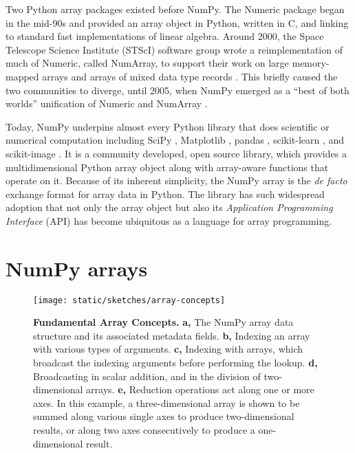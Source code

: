 Two Python array packages existed before NumPy.
The Numeric package began in the mid-90s and provided an array object in
Python, written in C, and linking to standard fast implementations of linear
algebra.
Around 2000, the Space Telescope Science Institute (STScI) software group wrote
a reimplementation of much of Numeric, called NumArray, to support their work
on large memory-mapped arrays and arrays of mixed data type
records \cite{STScI-slither}.
This briefly caused the two communities to diverge, until
2005, when NumPy emerged as a ``best of both worlds'' unification of Numeric
and NumArray \cite{oliphant2006guide}.

Today, NumPy underpins almost every Python library that does scientific or
numerical computation including SciPy \cite{virtanen2019scipy},
Matplotlib \cite{hunter2007matplotlib}, pandas \cite{mckinney-proc-scipy-2010},
scikit-learn \cite{pedregosa2011scikit}, and
scikit-image \cite{vanderwalt2014scikit}.
It is a community developed, open source library, which provides a
multidimensional Python array object along with array-aware functions
that operate on it.
Because of its inherent simplicity, the NumPy array is
the {\it de facto} exchange format for array data in Python.
The library has such widespread adoption that not only the array object but also its
{\it Application Programming Interface} (API) has become ubiquitous as
a language for array programming.

\section*{NumPy arrays}

\begin{figure*}
  \centering
  \texttt{[image: static/sketches/array-concepts]}   
  \caption{\textbf{Fundamental Array Concepts.}
    \textbf{a,} The NumPy array data structure and its associated metadata fields.
    \textbf{b,} Indexing an array with various types of arguments.
    \textbf{c,} Indexing with arrays, which broadcast the indexing arguments before performing the lookup.
    \textbf{d,} Broadcasting in scalar addition, and in the division of two-dimensional arrays.
    \textbf{e,} Reduction operations act along one or more axes. In this
    example, a three-dimensional array is shown to be summed along various single
    axes to produce two-dimensional results, or along two axes consecutively to
    produce a one-dimensional result.
   }
  \label{fig:array-concepts}
\end{figure*}

